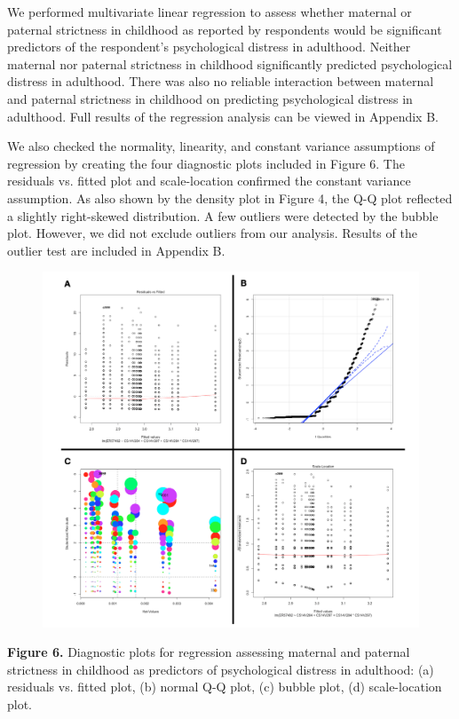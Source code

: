 \documentclass[12pt,letterpaper]{article}
\begin{document}
We performed multivariate linear regression to assess whether maternal or paternal strictness in childhood as reported by respondents would be significant predictors of the respondent's psychological distress in adulthood. Neither maternal nor paternal strictness in childhood significantly predicted psychological distress in adulthood. There was also no reliable interaction between maternal and paternal strictness in childhood on predicting psychological distress in adulthood. Full results of the regression analysis can be viewed in Appendix B. 

We also checked the normality, linearity, and constant variance assumptions of regression by creating the four diagnostic plots included in Figure 6.  The residuals vs. fitted plot and scale-location confirmed the constant variance assumption. As also shown by the density plot in Figure 4, the Q-Q plot reflected a slightly right-skewed distribution. A few outliers were detected by the bubble plot. However, we did not exclude outliers from our analysis. Results of the outlier test are included in Appendix B. 

\begin{figure}[H]
	\centering
	\includegraphics[scale=0.4]{reg2_asps.png}
\end{figure}	

\begin{center}
	\singlespacing
	\textbf{Figure 6.} Diagnostic plots for regression assessing maternal and paternal strictness in childhood as predictors of psychological distress in adulthood: (a) residuals vs. fitted plot, (b) normal Q-Q plot, (c) bubble plot, (d) scale-location plot.
\end{center}
\end{document}
